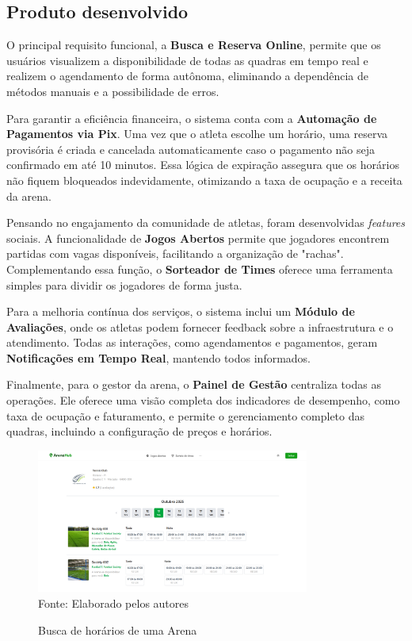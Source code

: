\documentclass[a4paper, 12pt, twoside]{article}
\begin{document}
\subsection{Produto desenvolvido}

O principal requisito funcional, a \textbf{Busca e Reserva Online}, permite que os usuários visualizem a disponibilidade de todas as quadras em tempo real e realizem o agendamento de forma autônoma, eliminando a dependência de métodos manuais e a possibilidade de erros.

Para garantir a eficiência financeira, o sistema conta com a \textbf{Automação de Pagamentos via Pix}. Uma vez que o atleta escolhe um horário, uma reserva provisória é criada e cancelada automaticamente caso o pagamento não seja confirmado em até 10 minutos. Essa lógica de expiração assegura que os horários não fiquem bloqueados indevidamente, otimizando a taxa de ocupação e a receita da arena.
\vspace{0.2cm}

Pensando no engajamento da comunidade de atletas, foram desenvolvidas \textit{features} sociais. A funcionalidade de \textbf{Jogos Abertos} permite que jogadores encontrem partidas com vagas disponíveis, facilitando a organização de "rachas". Complementando essa função, o \textbf{Sorteador de Times} oferece uma ferramenta simples para dividir os jogadores de forma justa.

Para a melhoria contínua dos serviços, o sistema inclui um \textbf{Módulo de Avaliações}, onde os atletas podem fornecer feedback sobre a infraestrutura e o atendimento. Todas as interações, como agendamentos e pagamentos, geram \textbf{Notificações em Tempo Real}, mantendo todos informados.

Finalmente, para o gestor da arena, o \textbf{Painel de Gestão} centraliza todas as operações. Ele oferece uma visão completa dos indicadores de desempenho, como taxa de ocupação e faturamento, e permite o gerenciamento completo das quadras, incluindo a configuração de preços e horários.

\begin{figure}[!htb]
\caption{Busca de horários de uma Arena}
\label{fig:backlog_clickup}
\centering
\includegraphics[width=0.8\textwidth]{figs/print_horarios_livres.png}\\
{\footnotesize Fonte: Elaborado pelos autores}
\end{figure}
\end{document}
